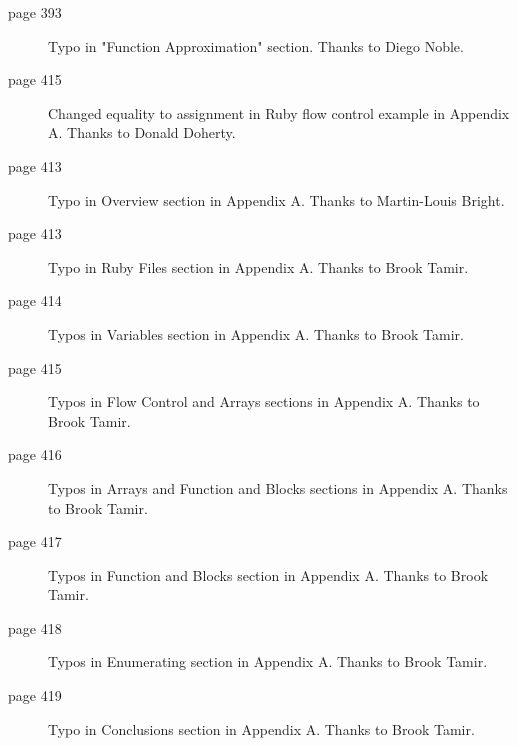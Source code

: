\begin{small}
\begin{description}
	\item[page 393] Typo in "Function Approximation" section. Thanks to Diego Noble.
	\item[page 415] Changed equality to assignment in Ruby flow control example in Appendix A. Thanks to Donald Doherty.
	\item[page 413] Typo in Overview section in Appendix A. Thanks to Martin-Louis Bright.
	\item[page 413] Typo in Ruby Files section in Appendix A. Thanks to Brook Tamir.
	\item[page 414] Typos in Variables section in Appendix A. Thanks to Brook Tamir.
	\item[page 415] Typos in Flow Control and Arrays sections in Appendix A. Thanks to Brook Tamir.
	\item[page 416] Typos in Arrays and Function and Blocks sections in Appendix A. Thanks to Brook Tamir.
	\item[page 417] Typos in Function and Blocks section in Appendix A. Thanks to Brook Tamir.
	\item[page 418] Typos in Enumerating section in Appendix A. Thanks to Brook Tamir.
	\item[page 419] Typo in Conclusions section in Appendix A. Thanks to Brook Tamir.
\end{description}

\end{small}
